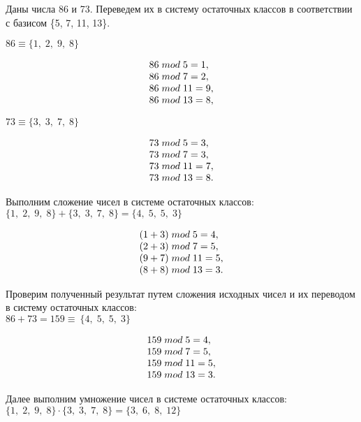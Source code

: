 \documentclass[a4paper,14pt]{extarticle}
\begin{document}
  Даны числа 86 и 73. Переведем их в систему остаточных классов в соответствии с базисом \{5, 7, 11, 13\}.

  $86 \equiv \{1,\;2,\;9,\;8\}$

  \[
  \begin{array}[c]{l}
    86\;mod\;5 = 1,\\
    86\;mod\;7 = 2,\\
    86\;mod\;11 = 9,\\
    86\;mod\;13 = 8,\\
  \end{array}
  \]

  $73 \equiv \{3,\;3,\;7,\;8\}$

  \[
  \begin{array}[c]{l}
    73\;mod\;5 = 3,\\
    73\;mod\;7 = 3,\\
    73\;mod\;11 = 7,\\
    73\;mod\;13 = 8.\\
  \end{array}
  \]

  Выполним сложение чисел в системе остаточных классов:\\
  $\{1,\;2,\;9,\;8\}+\{3,\;3,\;7,\;8\}=\{4,\;5,\;5,\;3\}$

  \[
  \begin{array}[c]{l}
    (1+3)\;mod\;5 = 4,\\
    (2+3)\;mod\;7 = 5,\\
    (9+7)\;mod\;11 = 5,\\
    (8+8)\;mod\;13 = 3.
  \end{array}
  \]

  Проверим полученный результат путем сложения исходных чисел и их переводом в систему остаточных классов:\\
  $86+73=159 \equiv\ \{4,\;5,\;5,\;3\}$

  \[
  \begin{array}[c]{l}
    159\;mod\;5 = 4,\\
    159\;mod\;7 = 5,\\
    159\;mod\;11 = 5,\\
    159\;mod\;13 = 3.\\
  \end{array}
  \]

  \pagebreak

  Далее выполним умножение чисел в системе остаточных классов:\\
  $\{1,\;2,\;9,\;8\} \cdot \{3,\;3,\;7,\;8\}=\{3,\;6,\;8,\;12\}$
\end{document}
